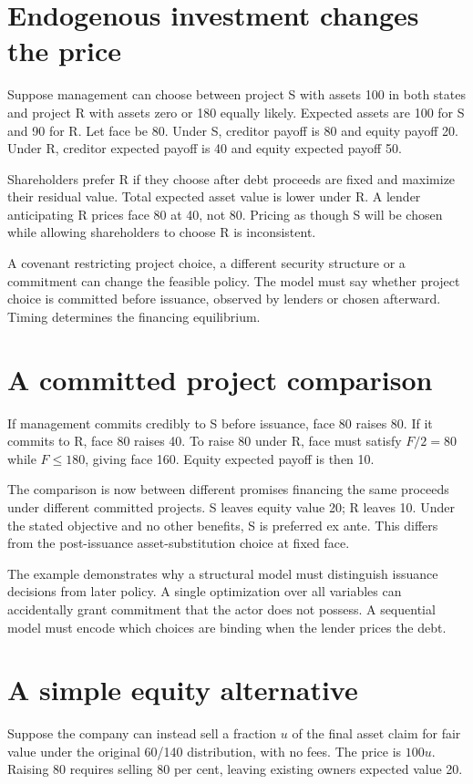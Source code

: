 \section{Endogenous investment changes the price}
Suppose management can choose between project S with assets 100 in both states and project R with assets zero or 180 equally likely. Expected assets are 100 for S and 90 for R. Let face be 80. Under S, creditor payoff is 80 and equity payoff 20. Under R, creditor expected payoff is 40 and equity expected payoff 50.

Shareholders prefer R if they choose after debt proceeds are fixed and maximize their residual value. Total expected asset value is lower under R. A lender anticipating R prices face 80 at 40, not 80. Pricing as though S will be chosen while allowing shareholders to choose R is inconsistent.

A covenant restricting project choice, a different security structure or a commitment can change the feasible policy. The model must say whether project choice is committed before issuance, observed by lenders or chosen afterward. Timing determines the financing equilibrium.

\section{A committed project comparison}
If management commits credibly to S before issuance, face 80 raises 80. If it commits to R, face 80 raises 40. To raise 80 under R, face must satisfy $F/2=80$ while $F\leq180$, giving face 160. Equity expected payoff is then 10.

The comparison is now between different promises financing the same proceeds under different committed projects. S leaves equity value 20; R leaves 10. Under the stated objective and no other benefits, S is preferred ex ante. This differs from the post-issuance asset-substitution choice at fixed face.

The example demonstrates why a structural model must distinguish issuance decisions from later policy. A single optimization over all variables can accidentally grant commitment that the actor does not possess. A sequential model must encode which choices are binding when the lender prices the debt.

\section{A simple equity alternative}
Suppose the company can instead sell a fraction $u$ of the final asset claim for fair value under the original 60/140 distribution, with no fees. The price is $100u$. Raising 80 requires selling 80 per cent, leaving existing owners expected value 20.


